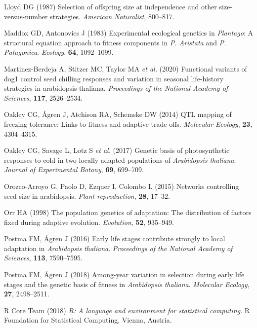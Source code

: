 \documentclass[]{article}
\begin{document}
\leavevmode\hypertarget{ref-Lloyd1987}{}%
Lloyd DG (1987) Selection of offspring size at independence and other size-versus-number strategies. \emph{American Naturalist}, 800--817.

\leavevmode\hypertarget{ref-Maddox1983}{}%
Maddox GD, Antonovics J (1983) Experimental ecological genetics in \emph{Plantago}: A structural equation approach to fitness components in \emph{P. Aristata} and \emph{P. Patagonica}. \emph{Ecology}, \textbf{64}, 1092--1099.

\leavevmode\hypertarget{ref-martinez2020functional}{}%
Martinez-Berdeja A, Stitzer MC, Taylor MA \emph{et al.} (2020) Functional variants of dog1 control seed chilling responses and variation in seasonal life-history strategies in arabidopsis thaliana. \emph{Proceedings of the National Academy of Sciences}, \textbf{117}, 2526--2534.

\leavevmode\hypertarget{ref-oakley2014qtl}{}%
Oakley CG, Ågren J, Atchison RA, Schemske DW (2014) QTL mapping of freezing tolerance: Links to fitness and adaptive trade-offs. \emph{Molecular Ecology}, \textbf{23}, 4304--4315.

\leavevmode\hypertarget{ref-oakley2017genetic}{}%
Oakley CG, Savage L, Lotz S \emph{et al.} (2017) Genetic basis of photosynthetic responses to cold in two locally adapted populations of \emph{Arabidopsis thaliana}. \emph{Journal of Experimental Botany}, \textbf{69}, 699--709.

\leavevmode\hypertarget{ref-orozco2015networks}{}%
Orozco-Arroyo G, Paolo D, Ezquer I, Colombo L (2015) Networks controlling seed size in arabidopsis. \emph{Plant reproduction}, \textbf{28}, 17--32.

\leavevmode\hypertarget{ref-orr1998population}{}%
Orr HA (1998) The population genetics of adaptation: The distribution of factors fixed during adaptive evolution. \emph{Evolution}, \textbf{52}, 935--949.

\leavevmode\hypertarget{ref-postma_early_2016}{}%
Postma FM, Ågren J (2016) Early life stages contribute strongly to local adaptation in \emph{Arabidopsis thaliana}. \emph{Proceedings of the National Academy of Sciences}, \textbf{113}, 7590--7595.

\leavevmode\hypertarget{ref-postma2018among}{}%
Postma FM, Ågren J (2018) Among-year variation in selection during early life stages and the genetic basis of fitness in \emph{Arabidopsis thaliana}. \emph{Molecular Ecology}, \textbf{27}, 2498--2511.

\leavevmode\hypertarget{ref-RCT2015}{}%
R Core Team (2018) \emph{R: A language and environment for statistical computing}. R Foundation for Statistical Computing, Vienna, Austria.
\end{document}
